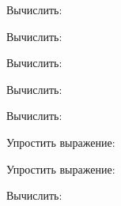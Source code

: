 \begin{listofex}
	\item Вычислить:
	\begin{enumcols}[itemcolumns=2]
		\item {}
		\item {}
	\end{enumcols}
	\item Вычислить:
	\begin{enumcols}[itemcolumns=4]
		\item {}
		\item {}
		\item {}
		\item {}
	\end{enumcols}
	\item Вычислить:
	\begin{enumcols}[itemcolumns=2]
		\item {}
		\item {}
	\end{enumcols}
	\item Вычислить:
	\begin{enumcols}[itemcolumns=3]
		\item {}
		\item {}
		\item {}
	\end{enumcols}
	\item Вычислить:
	\begin{enumcols}[itemcolumns=3]
		\item {}
		\item {}
		\item {}
	\end{enumcols}
	\item Упростить выражение:
	\begin{enumcols}[itemcolumns=2]
		\item {}
		\item {}
	\end{enumcols}
	\item Упростить выражение:
	\begin{enumcols}[itemcolumns=1]
		\item {}
		\item {}
	\end{enumcols}
	\item Вычислить:
	\begin{enumcols}[itemcolumns=2]
		\item {}
		\item {}
		\item {}
		\item {}
	\end{enumcols}
\end{listofex}